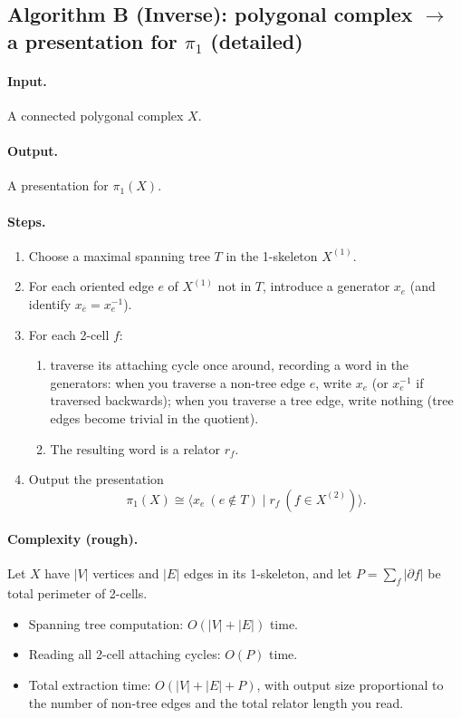 \documentclass[11pt]{article}
\theoremstyle{definition}
\theoremstyle{plain}
\theoremstyle{remark}
\begin{document}
\subsection*{Algorithm B (Inverse): polygonal complex $\to$ a presentation for $\pi_1$ (detailed)}\cite{hatcher2002,bridsonhaefliger1999}
\paragraph{Input.} A connected polygonal complex $X$.
\paragraph{Output.} A presentation for $\pi_1(X)$.

\paragraph{Steps.}
\begin{enumerate}[leftmargin=2.2em]
\item Choose a maximal spanning tree $T$ in the 1-skeleton $X^{(1)}$.
\item For each oriented edge $e$ of $X^{(1)}$ not in $T$, introduce a generator $x_e$ (and identify $x_{\overline e}=x_e^{-1}$).
\item For each 2-cell $f$:
\begin{enumerate}[leftmargin=2em]
\item traverse its attaching cycle once around, recording a word in the generators:
when you traverse a non-tree edge $e$, write $x_e$ (or $x_e^{-1}$ if traversed backwards);
when you traverse a tree edge, write nothing (tree edges become trivial in the quotient).
\item The resulting word is a relator $r_f$.
\end{enumerate}
\item Output the presentation
\[
\pi_1(X)\cong \langle x_e\ (e\notin T)\mid r_f\ (f\in X^{(2)})\rangle .
\]
\end{enumerate}



\paragraph{Complexity (rough).}\cite{hatcher2002,bridsonhaefliger1999}
Let $X$ have $|V|$ vertices and $|E|$ edges in its 1-skeleton, and let $P=\sum_f|\partial f|$ be total perimeter of 2-cells.
\begin{itemize}[leftmargin=2em]
\item Spanning tree computation: $O(|V|+|E|)$ time.
\item Reading all 2-cell attaching cycles: $O(P)$ time.
\item Total extraction time: $O(|V|+|E|+P)$, with output size proportional to the number of non-tree edges and the total relator length you read.
\end{itemize}
\end{document}
